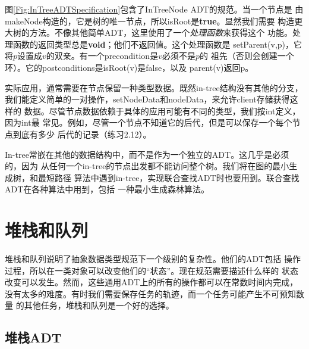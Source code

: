 图\ref{Fig:InTreeADTSpecification}包含了InTreeNode ADT的规范。当一个节点是
由makeNode构造的，它是树的唯一节点，所以isRoot是\textbf{true}。显然我们需要
构造更大树的方法。不像其他简单ADT，这里使用了一个\emph{处理函数}来获得这个
功能。处理函数的返回类型总是\textbf{void}；他们不返回值。这个处理函数是
setParent(v,p)，它将$p$设置成$v$的双亲。有一个precondition是$v$必须不是$p$的
祖先（否则会创建一个环）。它的postconditions是isRoot(v)是false，以及
parent(v)返回p。

实际应用，通常需要在节点保留一种类型数据。既然in-tree结构没有其他的分支，
我们能定义简单的一对操作，setNodeData和nodeData，来允许client存储获得这样的
数据。尽管节点数据依赖于具体的应用可能有不同的类型，我们按int定义，因为int最
常见。例如，尽管一个节点不知道它的后代，但是可以保存一个每个节点到底有多少
后代的记录（练习2.12）。

In-tree常嵌在其他的数据结构中，而不是作为一个独立的ADT。这几乎是必须的，因为
从任何一个in-tree的节点出发都不能访问整个树。我们将在图的最小生成树，和最短路径
算法中遇到in-tree，实现联合查找ADT时也要用到。联合查找ADT在各种算法中用到，包括
一种最小生成森林算法。

\section{堆栈和队列}
堆栈和队列说明了抽象数据类型规范下一个级别的复杂性。他们的ADT包括
操作过程，所以在一类对象可以改变他们的“状态”。现在规范需要描述什么样的
状态改变可以发生。然而，这些通用ADT上的所有的操作都可以在常数时间内完成，
没有太多的难度。有时我们需要保存任务的轨迹，而一个任务可能产生不可预知数量
的其他任务，堆栈和队列是一个好的选择。


\subsection{堆栈ADT}\label{Sec:StackADT}

